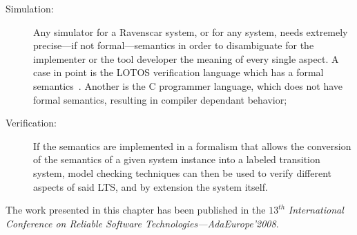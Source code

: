 \begin{description}
\item[Simulation:]{Any simulator for a Ravenscar system, or for any
  system, needs extremely precise---if not formal---semantics in order
  to disambiguate for the implementer or the tool developer the
  meaning of every single aspect. A case in point is the LOTOS
  verification language which has a formal
  semantics~\cite{turner@pstv87}. Another is the C programmer
  language, which does not have formal semantics, resulting in
  compiler dependant behavior;}
\item[Verification:]{If the semantics are implemented in a formalism
  that allows the conversion of the semantics of a given system
  instance into a labeled transition system, model checking techniques
  can then be used to verify different aspects of said LTS, and by
  extension the system itself.}
\end{description}

The work presented in this chapter has been published in the $13^{th}$
\emph{International Conference on Reliable Software Technologies---AdaEurope'2008}. 

